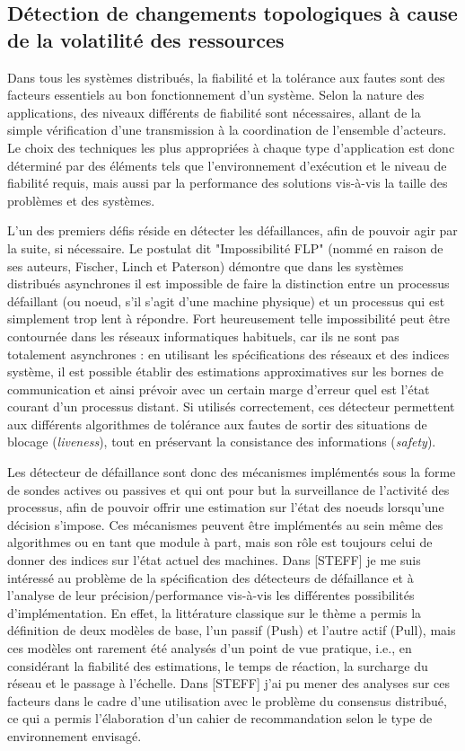 \documentclass[a4paper]{book}
\begin{document}
\subsection{Détection de changements topologiques à cause de la volatilité des ressources}
  
Dans tous les systèmes distribués, la fiabilité et la tolérance aux fautes sont des facteurs essentiels au bon fonctionnement d'un système. Selon la nature des applications, des niveaux différents de fiabilité sont nécessaires, allant de la simple vérification d'une transmission à la coordination de l'ensemble d'acteurs. Le choix des techniques les plus appropriées à chaque type d'application est donc déterminé par des éléments tels que l'environnement d'exécution et le niveau de fiabilité requis, mais aussi par la performance des solutions vis-à-vis la taille des problèmes et des systèmes.


L'un des premiers défis réside en détecter les défaillances, afin de pouvoir agir par la suite, si nécessaire. Le postulat dit "Impossibilité FLP" (nommé en raison de ses auteurs, Fischer, Linch et Paterson) démontre que dans les systèmes distribués asynchrones il est impossible de faire la distinction entre un processus défaillant (ou noeud, s'il s'agit d'une machine physique) et un processus qui est simplement trop lent à répondre. Fort heureusement telle impossibilité peut être contournée dans les réseaux informatiques habituels, car ils ne sont pas totalement asynchrones : en utilisant les spécifications des réseaux et des indices système, il est possible établir des estimations approximatives sur les bornes de communication et ainsi prévoir avec un certain marge d'erreur quel est l'état courant d'un processus distant. Si utilisés correctement, ces détecteur permettent aux différents algorithmes de tolérance aux fautes de sortir des situations de blocage (\textit{liveness}), tout en préservant la consistance des informations (\textit{safety}).

Les détecteur de défaillance sont donc des mécanismes implémentés sous la forme de sondes actives ou passives et qui ont pour but la surveillance de l'activité des processus, afin de pouvoir offrir une estimation sur l'état des noeuds lorsqu'une décision s'impose. Ces mécanismes peuvent être implémentés au sein même des algorithmes ou en tant que module à part, mais son rôle est toujours celui de donner des indices sur l'état actuel des machines. Dans [STEFF] je me suis intéressé au problème de la spécification des détecteurs de défaillance et à l'analyse de leur précision/performance vis-à-vis les différentes possibilités d'implémentation. En effet, la littérature classique sur le thème a permis la définition de deux modèles de base, l'un passif (Push) et l'autre actif (Pull), mais ces modèles ont rarement été analysés d'un point de vue pratique, i.e., en considérant la fiabilité des estimations, le temps de réaction, la surcharge du réseau et le passage à l'échelle. Dans [STEFF] j'ai pu mener des analyses sur ces facteurs dans le cadre d'une utilisation avec le problème du consensus distribué, ce qui a permis l'élaboration d'un cahier de recommandation selon le type de environnement envisagé. 
\end{document}
